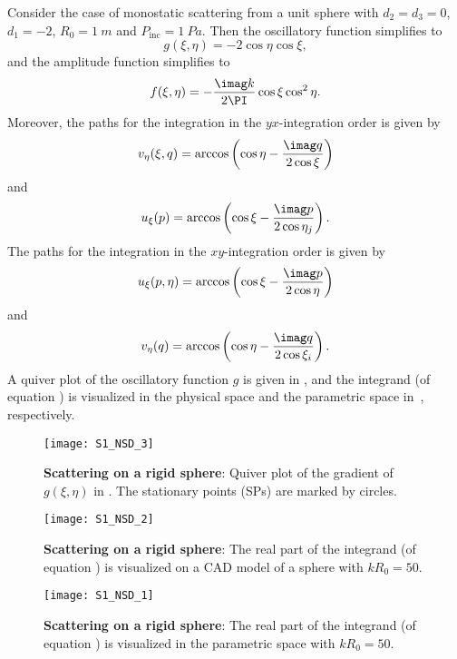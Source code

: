 Consider the case of monostatic scattering from a unit sphere with $d_2=d_3=0$, $d_1=-2$, $R_0=\SI{1}{m}$ and $P_{\mathrm{inc}}=\SI{1}{Pa}$. Then the oscillatory function simplifies to
\begin{equation}\label{Eq4:simplified_g}
	g(\xi,\eta)=-2\cos\eta\cos\xi,
\end{equation}
and the amplitude function simplifies to
\begin{equation}\label{Eq4:simplified_f}
	f(\xi,\eta) = -\frac{\imag k}{2\PI}\cos\xi\cos^2\eta.
\end{equation}
Moreover, the paths for the integration in the $yx$-integration order is given by
\begin{align*}
v_\eta(\xi,q) = \arccos\left(\cos\eta-\frac{\imag q}{2\cos\xi}\right)
\end{align*}
and
\begin{equation*}
	u_\xi(p) = \arccos\left(\cos\xi-\frac{\imag p}{2\cos\eta_j}\right).
\end{equation*}
The paths for the integration in the $xy$-integration order is given by
\begin{equation*}
	u_\xi(p,\eta) = \arccos\left(\cos\xi-\frac{\imag p}{2\cos\eta}\right)
\end{equation*}
and
\begin{align*}
v_\eta(q) = \arccos\left(\cos\eta-\frac{\imag q}{2\cos\xi_i}\right).
\end{align*}
A quiver plot of the oscillatory function $g$ is given in , and the integrand (of equation ) is visualized in the physical space and the parametric space in~, respectively.
\begin{figure}
	\centering
	\texttt{[image: S1\_NSD\_3]}
	\caption{\textbf{Scattering on a rigid sphere}: Quiver plot of the gradient of $g(\xi,\eta)$ in . The stationary points (SPs) are marked by circles.}
	\label{Fig4:quiver_g}
\end{figure}
\begin{figure}
	\centering
	\texttt{[image: S1\_NSD\_2]}
	\caption{\textbf{Scattering on a rigid sphere}: The real part of the integrand (of equation ) is visualized on a CAD model of a sphere with $kR_0=50$.}
	\label{Fig4:rigidSphereCAD}
\end{figure}
\begin{figure}
	\centering
	\texttt{[image: S1\_NSD\_1]}
	\caption{\textbf{Scattering on a rigid sphere}: The real part of the integrand (of equation ) is visualized in the parametric space with $kR_0=50$.}
	\label{Fig4:rigidSphereParm}
\end{figure}

